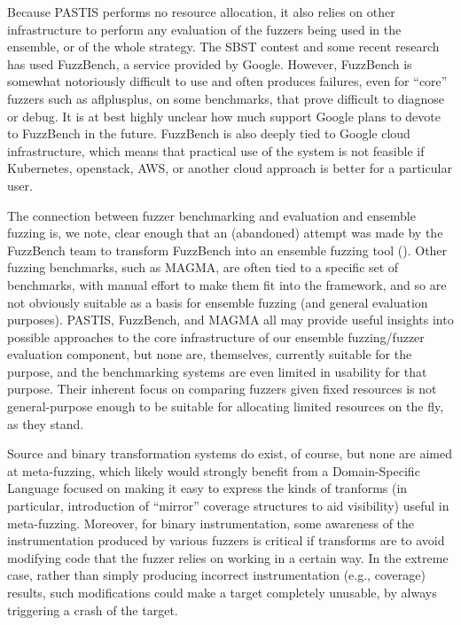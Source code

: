 Because PASTIS performs no resource allocation, it also relies on other 
infrastructure to perform any evaluation of the fuzzers being used in the 
ensemble, or of the whole strategy.  The SBST contest and some recent research 
has used FuzzBench, a service provided by Google.  However, FuzzBench is 
somewhat notoriously difficult to use and often produces failures, even for 
``core'' fuzzers such as aflplusplus, on some benchmarks, that prove difficult 
to diagnose or debug.  It is at best highly unclear how much support Google 
plans to devote to FuzzBench in the future.  FuzzBench is also deeply
tied to Google cloud infrastructure, which means that practical use of
the system is not feasible if Kubernetes, openstack, AWS, or another
cloud approach is better for a particular user.

The connection between fuzzer 
benchmarking and evaluation and ensemble fuzzing is, we note, clear enough that 
an (abandoned) attempt was made by the FuzzBench team to transform FuzzBench 
into an ensemble fuzzing tool (\url{}).   Other fuzzing benchmarks, such as 
MAGMA, are often tied to a specific set of benchmarks, with manual effort to 
make them fit into the framework, and so are not obviously suitable as a basis 
for ensemble fuzzing (and general evaluation purposes).  PASTIS, FuzzBench, and 
MAGMA all may provide useful insights into possible approaches to the core 
infrastructure of our ensemble fuzzing/fuzzer evaluation component, but none 
are, themselves, currently suitable for the purpose, and the benchmarking 
systems are even limited in usability for that purpose.   Their
inherent focus on comparing fuzzers given fixed resources is not
general-purpose enough to be suitable for allocating limited resources
on the fly, as they stand.


Source and binary transformation systems do exist, of course, but none are 
aimed at meta-fuzzing, which likely would strongly benefit from a 
Domain-Specific Language focused on making it easy to express the kinds of 
tranforms (in particular, introduction of ``mirror'' coverage structures to aid 
visibility) useful in meta-fuzzing.  Moreover, for binary instrumentation, some 
awareness of the instrumentation produced by various fuzzers is critical if 
transforms are to avoid modifying code that the fuzzer relies on working in a 
certain way.  In the extreme case, rather than simply producing incorrect 
instrumentation (e.g., coverage) results, such modifications could make a 
target completely unusable, by always triggering a crash of the target.

